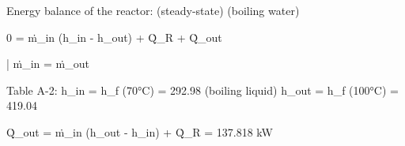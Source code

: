 Energy balance of the reactor: (steady-state) (boiling water)  

0 = ṁ_in (h_in - h_out) + Q̇_R + Q̇_out  

| ṁ_in = ṁ_out  

Table A-2:  
h_in = h_f (70°C) = 292.98 (boiling liquid)  
h_out = h_f (100°C) = 419.04  

Q̇_out = ṁ_in (h_out - h_in) + Q̇_R = 137.818 kW